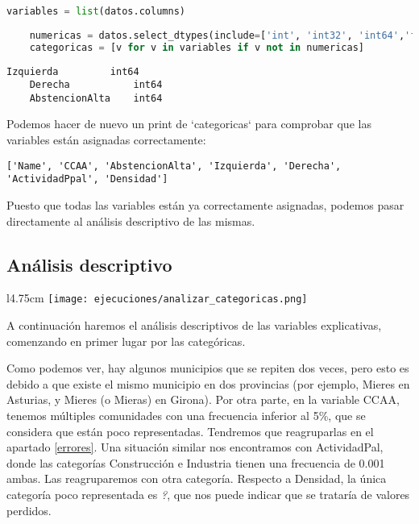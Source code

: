 \documentclass[a4paper,onecolumn]{extarticle}
\begin{document}
\begin{sloppypar}
\begin{lstlisting}[language=Python]
    variables = list(datos.columns)
    
    numericas = datos.select_dtypes(include=['int', 'int32', 'int64','float', 'float32', 'float64']).columns
    categoricas = [v for v in variables if v not in numericas]
\end{lstlisting}

\begin{lstlisting}[numbers=none]
    Izquierda         int64
    Derecha           int64
    AbstencionAlta    int64
\end{lstlisting}

Podemos hacer de nuevo un print de `categoricas` para comprobar que las variables están asignadas correctamente: 
\begin{lstlisting}[numbers=none]
    ['Name', 'CCAA', 'AbstencionAlta', 'Izquierda', 'Derecha', 'ActividadPpal', 'Densidad']
\end{lstlisting}

Puesto que todas las variables están ya correctamente asignadas, podemos pasar directamente al análisis descriptivo de las mismas.

\subsection{Análisis descriptivo}\label{analisis}
\begin{wrapfigure}[11]{l}{4.75cm}
    \texttt{[image: ejecuciones/analizar\_categoricas.png]}
\end{wrapfigure}

A continuación haremos el análisis descriptivos de las variables explicativas, comenzando en primer lugar por las categóricas.

Como podemos ver, hay algunos municipios que se repiten dos veces, pero esto es debido a que existe el mismo municipio en dos provincias (por ejemplo, Mieres 
en Asturias, y Mieres (o Mieras) en Girona). Por otra parte, en la variable CCAA, tenemos múltiples comunidades con una frecuencia inferior al 5\%, que se 
considera que están poco representadas. Tendremos que reagruparlas en el apartado \ref{errores}. Una situación similar nos encontramos con ActividadPal,
donde las categorías Construcción e Industria tienen una frecuencia de 0.001 ambas. Las reagruparemos con otra categoría. Respecto a Densidad, la única categoría 
poco representada es \textit{?}, que nos puede indicar que se trataría de valores perdidos.


\end{sloppypar}
\end{document}
